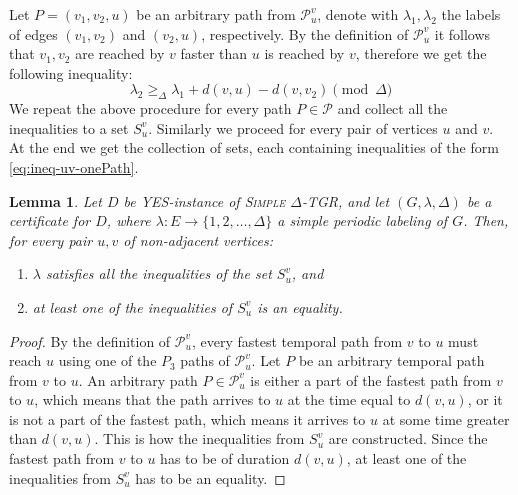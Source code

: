 \documentclass[11pt,a4paper]{article}
\newtheorem{lemma}[theorem]{Lemma}
\theoremstyle{remark}
\theoremstyle{definition}
\begin{document}
	Let $P = (v_1,v_2,u)$ be an arbitrary path from $\mathcal{P}_u^v$, denote with $\lambda_1, \lambda_2$ the labels of edges $(v_1,v_2)$ and $(v_2, u)$, respectively.
	By the definition of $\mathcal{P}_u^v$ it follows that $v_1, v_2$ are reached by $v$ faster than $u$ is reached by $v$, therefore we get the following inequality:
	\begin{equation}\label{eq:ineq-uv-onePath}
	    \lambda_2 \geq_\Delta \lambda_1 + d(v,u)-d(v,v_2) \pmod \Delta
	\end{equation}
	We repeat the above procedure for every path $P \in \mathcal{P}$ and collect all the inequalities to a set $S_u^v$.
	Similarly we proceed for every pair of vertices $u$ and $v$.
	At the end we get the collection of sets, each containing inequalities of the form \cref{eq:ineq-uv-onePath}.
	
	\begin{lemma}
	\label{claim:exact-setsOfInequalities}
    Let $D$ be \textsc{YES}-instance of \textsc{Simple $\Delta$-TGR}, and let 
$(G,\lambda,\Delta)$ be a certificate for $D$, where $\lambda:E\rightarrow \{1,2,\ldots,\Delta\}$ a simple periodic labeling of $G$. Then, for every pair $u,v$ of non-adjacent vertices:
	\begin{enumerate}
	    \item \label{itemize:Claim-exact-AtLeastOneEquality-1} $\lambda$ satisfies all the inequalities of the set $S_u^v$, and 
	    \item \label{itemize:Claim-exact-AtLeastOneEquality} at least one of the inequalities of $S_u^v$ is an equality.
	\end{enumerate}
	\end{lemma}

    \begin{proof}
    By the definition of $\mathcal{P}_u^v$, every fastest temporal path from $v$ to $u$ must reach $u$ using one of the $P_3$ paths of $\mathcal{P}_u^v$.
    Let $P$ be an arbitrary temporal path from $v$ to $u$. 
    An arbitrary path $P \in \mathcal{P}_u^v$ is either a part of the fastest path from $v$ to $u$, which means that the path arrives to $u$ at the time equal to $d(v,u)$,
    or it is not a part of the fastest path, which means it arrives to $u$ at some time greater than $d(v,u)$.
    This is how the inequalities from $S_u^v$ are constructed. 
    Since the fastest path from $v$ to $u$ has to be of duration $d(v,u)$, at least one of the inequalities from $S_u^v$ has to be an equality.    
    \end{proof}
    
\end{document}
